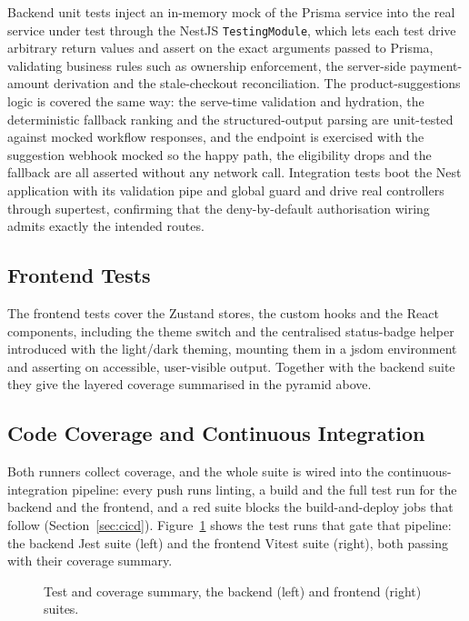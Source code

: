 Backend unit tests inject an in-memory mock of the Prisma service into
the real service under test through the NestJS \texttt{TestingModule},
which lets each test drive arbitrary return values and assert on the
exact arguments passed to Prisma, validating business rules such as
ownership enforcement, the server-side payment-amount derivation and the
stale-checkout reconciliation. The product-suggestions logic is covered
the same way: the serve-time validation and hydration, the deterministic
fallback ranking and the structured-output parsing are unit-tested against
mocked workflow responses, and the endpoint is exercised with the
suggestion webhook mocked so the happy path, the eligibility drops and the
fallback are all asserted without any network call. Integration tests boot
the Nest application with its validation pipe and global guard and drive
real controllers through supertest, confirming that the deny-by-default
authorisation wiring admits exactly the intended routes.

\subsection{Frontend Tests}

The frontend tests cover the Zustand stores, the custom hooks and the
React components, including the theme switch and the centralised
status-badge helper introduced with the light/dark theming, mounting
them in a jsdom environment and asserting on accessible, user-visible
output. Together with the backend suite they give the layered coverage
summarised in the pyramid above.

\subsection{Code Coverage and Continuous Integration}

Both runners collect coverage, and the whole suite is wired into the
continuous-integration pipeline: every push runs linting, a build and the
full test run for the backend and the frontend, and a red suite blocks
the build-and-deploy jobs that follow (Section~\ref{sec:cicd}).
Figure~\ref{fig:real-ci} shows the test runs that gate that pipeline: the
backend Jest suite (left) and the frontend Vitest suite (right), both
passing with their coverage summary.

\begin{figure}[H]
  \centering
  \caption{Test and coverage summary, the backend (left) and frontend (right) suites.}
  \label{fig:real-ci}
\end{figure}

